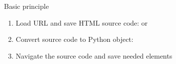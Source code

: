 \begin{frame}{Basic principle}
\begin{enumerate}
	\item Load URL and save HTML source code:  or 
	\item Convert source code to Python object: 
	\item Navigate the source code and save needed elements
\end{enumerate}
\end{frame}